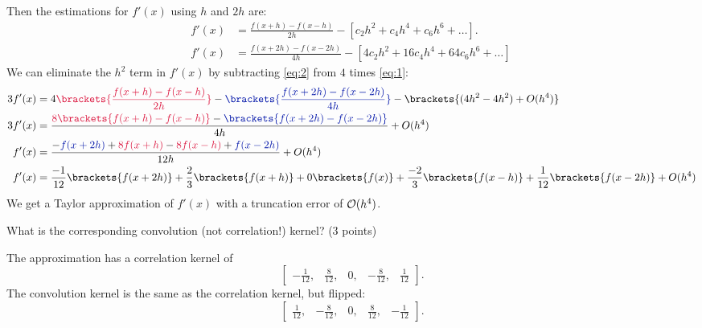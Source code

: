 \begin{problem}
\begin{enumroman}
\begin{Answer}
        Then the estimations for $f'(x)$ using $h$ and $2h$ are:
        \begin{align}
          f'(x) &= \frac{f(x+h) - f(x-h)}{2h} - \left[ c_2 h^2 + c_4 h^4 + c_6 h^6 + \ldots \right].~\label{eq:1} \\
          f'(x) &= \frac{f(x+2h) - f(x-2h)}{4h} - \left[ 4c_2 h^2 + 16 c_4 h^4 + 64 c_6h^6 + \ldots \right]~\label{eq:2}
        \end{align}
        We can eliminate the $h^2$ term in $f'(x)$ by subtracting \ref{eq:2} from $4$ times \ref{eq:1}:
        \begin{align*}
          3f'(x) &= 4 \crim{\brackets{\frac{f(x+h) - f(x-h)}{2h}}} - \zaff{\brackets{\frac{f(x+2h) - f(x-2h)}{4h}}} - \brackets{(4h^2 - 4h^2) + O(h^4)} \\
          3f'(x) &= \frac{\crim{8\brackets{f(x+h) - f(x-h)}} - \zaff{\brackets{f(x+2h) - f(x-2h)}}}{4h} + O(h^4) \\
          f'(x) &= \frac{-\zaff{f(x+2h)} + \crim{8f(x+h)} - \crim{8f(x-h)} + \zaff{f(x-2h)}}{12h} + O(h^4) \\
          f'(x) &= \frac{-1}{12}\brackets{f(x+2h)} + \frac{2}{3}\brackets{f(x+h)} + 0\brackets{f(x)} + \frac{-2}{3}\brackets{f(x-h)} + \frac{1}{12}\brackets{f(x-2h)} + O(h^4)
        \end{align*}
        We get a Taylor approximation of $f'(x)$ with a truncation error of $\mathcal{O}(h^4)$.  
      \end{Answer}
    \item What is the corresponding convolution (not correlation!) kernel? (3 points)
    \begin{Answer}
      The approximation has a correlation kernel of
      \[
        \begin{bmatrix}
          -\frac{1}{12}, & \frac{8}{12}, &0, & -\frac{8}{12}, & \frac{1}{12}
        \end{bmatrix}.
      \]
      The convolution kernel is the same as the correlation kernel, but flipped:
      \[
        \begin{bmatrix}
          \frac{1}{12}, & -\frac{8}{12}, &0, & \frac{8}{12}, & -\frac{1}{12}
        \end{bmatrix}.  
      \]
    \end{Answer}
  \end{enumroman}
\end{problem}
